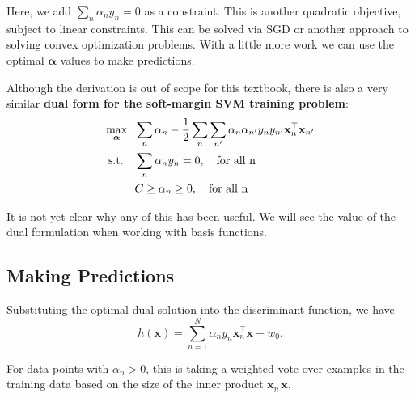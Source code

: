                                        Here, we add $ \sum_n\alpha_n y_n=0$ as a constraint.
                                        This is another quadratic objective, subject to linear constraints.  This can be solved via SGD or another approach to solving convex optimization problems.
                                        With a little more work we can use the optimal  $\boldsymbol{\alpha}$ values to make predictions.


                                        Although the derivation is out of scope for this textbook, there is also a very similar {\bf dual form for the soft-margin SVM training problem}:
%
      \begin{align}
        \max_{\boldsymbol{\alpha}}\ \ & \sum_n\alpha_n - \frac{1}{2} \sum_{n} \sum_{n'} \alpha_{n} \alpha_{n'} y_{n} y_{n'} \textbf{x}_{n}^\top \textbf{x}_{n'} \label{eq:dpsoft} \\
        \mbox{s.t.}\quad & \sum_n\alpha_n y_n=0, \quad\mbox{for all n}\notag \\
                                      & C \geq \alpha_n \geq 0, \quad\mbox{for all n}\notag
                                        \end{align}            
                                        

It is not yet clear why any of this has been useful. We will see the value of the dual formulation when working with basis functions.
                                        
                                        
       

\subsection{Making Predictions}


Substituting the optimal dual solution into the discriminant function, we have
%
\begin{equation} \label{new-classification-fn}
	h(\textbf{x}) = \sum_{n=1}^{N} \alpha_{n} y_{n} \mathbf{x}_{n}^\top \mathbf{x} + w_{0}.
      \end{equation}

      For data points with $\alpha_n>0$, this is taking a weighted vote over examples in the training data based on the size of the inner product $\mathbf{x}^\top_n\mathbf{x}$.
      
